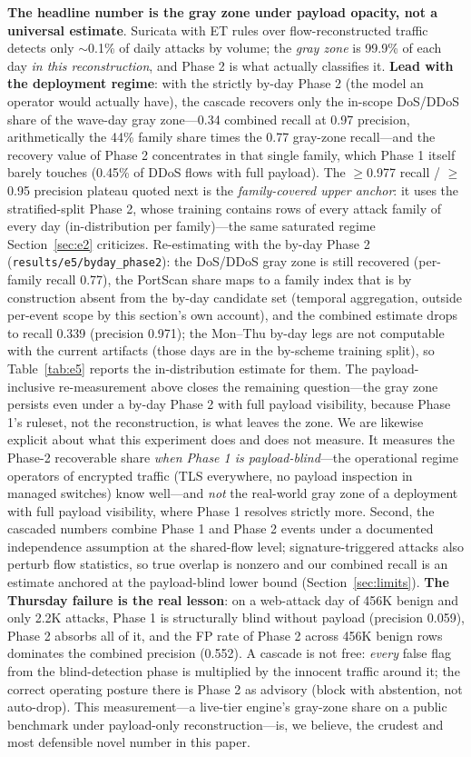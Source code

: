 \documentclass[sigconf,anonymous=false]{acmart}
\begin{document}
\textbf{The headline number is the gray zone under payload opacity, not a universal estimate}. Suricata with ET rules over flow-reconstructed traffic detects only $\sim$0.1\% of daily attacks by volume; the \emph{gray zone} is 99.9\% of each day \emph{in this reconstruction}, and Phase 2 is what actually classifies it. \textbf{Lead with the deployment regime}: with the strictly by-day Phase 2 (the model an operator would actually have), the cascade recovers only the in-scope DoS/DDoS share of the wave-day gray zone---0.34 combined recall at 0.97 precision, arithmetically the 44\% family share times the 0.77 gray-zone recall---and the recovery value of Phase 2 concentrates in that single family, which Phase 1 itself barely touches (0.45\% of DDoS flows with full payload). The $\ge$0.977 recall / $\ge$0.95 precision plateau quoted next is the \emph{family-covered upper anchor}: it uses the stratified-split Phase 2, whose training contains rows of every attack family of every day (in-distribution per family)---the same saturated regime Section~\ref{sec:e2} criticizes. Re-estimating with the by-day Phase 2 (\texttt{results/e5/byday\_phase2}): the DoS/DDoS gray zone is still recovered (per-family recall 0.77), the PortScan share maps to a family index that is by construction absent from the by-day candidate set (temporal aggregation, outside per-event scope by this section's own account), and the combined estimate drops to recall 0.339 (precision 0.971); the Mon--Thu by-day legs are not computable with the current artifacts (those days are in the by-scheme training split), so Table~\ref{tab:e5} reports the in-distribution estimate for them. The payload-inclusive re-measurement above closes the remaining question---the gray zone persists even under a by-day Phase 2 with full payload visibility, because Phase 1's ruleset, not the reconstruction, is what leaves the zone. We are likewise explicit about what this experiment does and does not measure. It measures the Phase-2 recoverable share \emph{when Phase 1 is payload-blind}---the operational regime operators of encrypted traffic (TLS everywhere, no payload inspection in managed switches) know well---and \emph{not} the real-world gray zone of a deployment with full payload visibility, where Phase 1 resolves strictly more. Second, the cascaded numbers combine Phase 1 and Phase 2 events under a documented independence assumption at the shared-flow level; signature-triggered attacks also perturb flow statistics, so true overlap is nonzero and our combined recall is an estimate anchored at the payload-blind lower bound (Section~\ref{sec:limits}). \textbf{The Thursday failure is the real lesson}: on a web-attack day of 456K benign and only 2.2K attacks, Phase 1 is structurally blind without payload (precision 0.059), Phase 2 absorbs all of it, and the FP rate of Phase 2 across 456K benign rows dominates the combined precision (0.552). A cascade is not free: \emph{every} false flag from the blind-detection phase is multiplied by the innocent traffic around it; the correct operating posture there is Phase 2 as advisory (block with abstention, not auto-drop). This measurement---a live-tier engine's gray-zone share on a public benchmark under payload-only reconstruction---is, we believe, the crudest and most defensible novel number in this paper.
\end{document}

